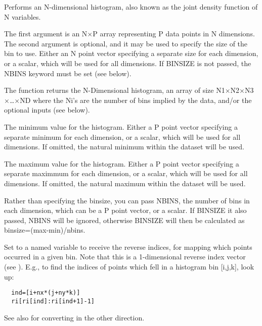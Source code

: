 %
Performs an N-dimensional histogram, also known as the joint
density function of N variables.

The first argument is an N$\times$P array representing P data points in N dimensions.  
The second argument is optional, and it may be used to specify the size of the bin to use. 
Either an N point vector specifying a separate size for each dimension, or a scalar,
which will be used for all dimensions.  If BINSIZE is not passed, the NBINS keyword must be set (see below).

The function returns the N-Dimensional histogram, an array of size
N1$\times$N2$\times$N3$\times$\ldots$\times$ND where the Ni's are the 
number of bins implied by the data, and/or the optional inputs (see below).

The minimum value for the histogram.  Either a P point
vector specifying a separate minimum for each dimension, or
a scalar, which will be used for all dimensions.  
If omitted, the natural minimum within the dataset will be used.

The maximum value for the histogram.  Either a P point vector specifying 
a separate maximmum for each dimension, or a scalar, which will be used for 
all dimensions. If omitted, the natural maximum within the dataset will be used.

Rather than specifying the binsize, you can pass NBINS,
the number of bins in each dimension, which can be a P point
vector, or a scalar.  If BINSIZE it also passed, NBINS will
be ignored, otherwise BINSIZE will then be calculated as
binsize=(max-min)/nbins.  

Set to a named variable to receive the reverse indices, for mapping which 
points occurred in a given bin.  Note that this is a 1-dimensional reverse index
vector (see ).  E.g., to find the indices of points
which fell in a histogram bin [i,j,k], look up:
\begin{verbatim}
  ind=[i+nx*(j+ny*k)]
  ri[ri[ind]:ri[ind+1]-1]
\end{verbatim}
See also  for converting in the other direction.

